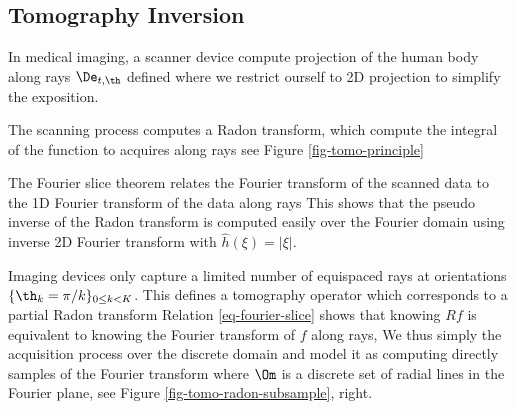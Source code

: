 \subsection{Tomography Inversion}

In medical imaging, a scanner device compute projection of the human body along rays $\De_{t,\th}$ defined
where we restrict ourself to 2D projection to simplify the exposition.

The scanning process computes a Radon transform, which compute the integral of the function to acquires along rays
\eq{
	\foralls \th \in [0,\pi), \foralls t \in \RR, \quad
	p_{\th}(t) = \int_{\De_{t,\th}} f(x) \,d s
	 = \iint f(x)\, \de( x \cdot \tau_\theta - t )\, d x 
}
see Figure \eqref{fig-tomo-principle}


The Fourier slice theorem relates the Fourier transform of the scanned data to the 1D Fourier transform of the data along rays
\eql{\label{eq-fourier-slice}
	\foralls \th \in [0,\pi)~,~ 
\foralls \xi \in \RR\quad
		\hat p_\th(\xi) = \hat f( \xi \cos \th, \xi \sin \th ).
}
This shows that the pseudo inverse of the Radon transform is computed easily over the Fourier domain using inverse 2D Fourier transform
with $\hat h(\xi) = |\xi|$.




Imaging devices only capture a limited number of equispaced rays at orientations $\{ \th_k = \pi/k \}_{0 \leq k < K}$. This defines a tomography operator which corresponds to a partial Radon transform
Relation \eqref{eq-fourier-slice} shows that knowing $R f$ is equivalent to knowing the Fourier transform of $f$ along rays, 
We thus simply the acquisition process over the discrete domain and model it as computing directly samples of the Fourier transform 
where $\Om$ is a discrete set of radial lines in the Fourier plane, see Figure \ref{fig-tomo-radon-subsample}, right.

